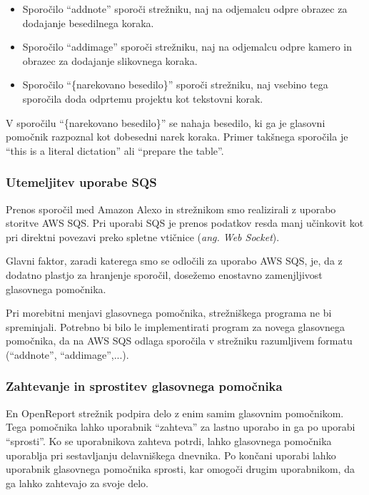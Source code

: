 \documentclass[a4paper, 12pt]{book}
\begin{document}
\begin{itemize}
	\item Sporočilo \enquote{addnote} sporoči strežniku, naj na odjemalcu odpre obrazec za dodajanje besedilnega koraka.
	\item Sporočilo \enquote{addimage} sporoči strežniku, naj na odjemalcu odpre kamero in obrazec za dodajanje slikovnega koraka.
	\item Sporočilo \enquote{\{narekovano besedilo\}} sporoči strežniku, naj vsebino tega sporočila doda odprtemu projektu kot tekstovni korak.
\end{itemize}

V sporočilu \enquote{\{narekovano besedilo\}} se nahaja besedilo, ki ga je glasovni pomočnik razpoznal kot dobesedni narek koraka.
Primer takšnega sporočila je \enquote{this is a literal dictation} ali \enquote{prepare the table}.

\subsubsection{Utemeljitev uporabe SQS}

Prenos sporočil med Amazon Alexo in strežnikom smo realizirali z uporabo storitve AWS SQS.
Pri uporabi SQS je prenos podatkov resda manj učinkovit kot pri direktni povezavi preko spletne vtičnice (\textit{ang. Web Socket}).

Glavni faktor, zaradi katerega smo se odločili za uporabo AWS SQS, je, da z dodatno plastjo za hranjenje sporočil, dosežemo enostavno zamenjljivost glasovnega pomočnika.

Pri morebitni menjavi glasovnega pomočnika, strežniškega programa ne bi spreminjali.
Potrebno bi bilo le implementirati program za novega glasovnega pomočnika, da na AWS SQS odlaga sporočila v strežniku razumljivem formatu (\enquote{addnote}, \enquote{addimage},...).

\subsubsection{Zahtevanje in sprostitev glasovnega pomočnika}

En OpenReport strežnik podpira delo z enim samim glasovnim pomočnikom.
Tega pomočnika lahko uporabnik \enquote{zahteva} za lastno uporabo in ga po uporabi \enquote{sprosti}.
Ko se uporabnikova zahteva potrdi, lahko glasovnega pomočnika uporablja pri sestavljanju delavniškega dnevnika.
Po končani uporabi lahko uporabnik glasovnega pomočnika sprosti, kar omogoči drugim uporabnikom, da ga lahko zahtevajo za svoje delo.
\end{document}
